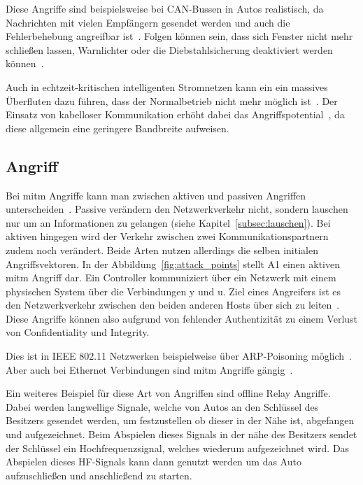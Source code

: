 Diese Angriffe sind beispielsweise bei CAN-Bussen in Autos realistisch, da Nachrichten mit vielen Empfängern gesendet werden und auch die Fehlerbehebung angreifbar ist~\cite{HUM 81,26}.%
Folgen können sein, dass sich Fenster nicht mehr schließen lassen, Warnlichter oder die Diebstahlsicherung deaktiviert werden können~\cite{HUM 68}.

Auch in echtzeit-kritischen intelligenten Stromnetzen kann ein ein massives Überfluten dazu führen, dass der Normalbetrieb nicht mehr möglich ist~\cite{HUM 98}.
Der Einsatz von kabelloser Kommunikation erhöht dabei das Angriffspotential~\cite{HUM 99}, da diese allgemein eine geringere Bandbreite aufweisen.
\subsection{ Angriff}\label{subsec:mitm}
Bei \gls{mitm} Angriffe kann man zwischen aktiven und passiven Angriffen unterscheiden~\cite{WYX+10}.%
Passive verändern den Netzwerkverkehr nicht, sondern lauschen nur um an Informationen zu gelangen (siehe Kapitel~\ref{subsec:lauschen}).
Bei aktiven hingegen wird der Verkehr zwischen zwei Kommunikationspartnern zudem noch verändert.
Beide Arten nutzen allerdings die selben initialen Angriffsvektoren.
In der Abbildung~\ref{fig:attack_points} stellt A1 einen aktiven \gls{mitm} Angriff dar.
Ein Controller kommuniziert über ein Netzwerk mit einem physischen System über die Verbindungen y und u.
Ziel eines Angreifers ist es den Netzwerkverkehr zwischen den beiden anderen Hosts über sich zu leiten~\cite{WYX+10,FPA+18}.
Diese Angriffe können also aufgrund von fehlender Authentizität zu einem Verlust von Confidentiality und Integrity.

Dies ist in IEEE 802.11 Netzwerken beispielweise über ARP-Poisoning möglich~\cite{FIT+2012}.
Aber auch bei Ethernet Verbindungen sind \gls{mitm} Angriffe gängig~\cite{HLL+17}.

Ein weiteres Beispiel für diese Art von Angriffen sind offline Relay Angriffe.
Dabei werden langwellige Signale, welche von Autos an den Schlüssel des Besitzers gesendet werden, um festzustellen ob dieser in der Nähe ist, abgefangen und aufgezeichnet.
Beim Abspielen dieses Signals in der nähe des Besitzers sendet der Schlüssel ein Hochfrequenzsignal, welches wiederum aufgezeichnet wird.
Das Abspielen dieses HF-Signals kann dann genutzt werden um das Auto aufzuschließen und anschließend zu starten.~\cite{HLL+17}

